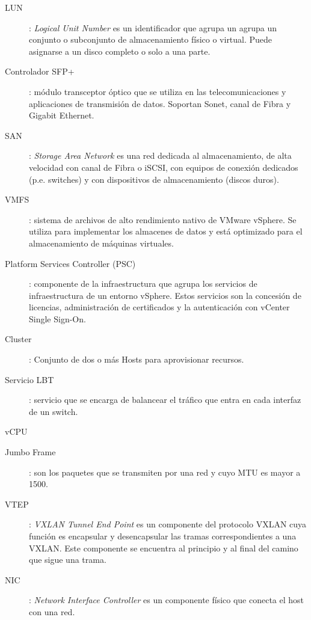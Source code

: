 \begin{description}
 \label{itm:almacendatos}
 \item [LUN]: \textit{Logical Unit Number} es un identificador que agrupa un agrupa un conjunto o subconjunto de almacenamiento físico o virtual. Puede asignarse a un disco completo o solo a una parte.
 \label{itm:lun}
 \item [Controlador SFP+]: módulo transceptor óptico que se utiliza en las telecomunicaciones y aplicaciones de transmisión de datos. Soportan Sonet, canal de Fibra y Gigabit Ethernet.
 \label{itm:sfp}
 \item [SAN]: \textit{Storage Area Network} es una red dedicada al almacenamiento, de alta velocidad con canal de Fibra o iSCSI, con equipos de conexión dedicados (p.e. switches) y con dispositivos de almacenamiento (discos duros). 
 \label{itm:san}
 \item [VMFS]: sistema de archivos de alto rendimiento nativo de VMware vSphere. Se utiliza para implementar los almacenes de datos y está optimizado para el almacenamiento de máquinas virtuales.
 \label{itm:vmfs}
 \item [Platform Services Controller (PSC)]: componente de la infraestructura que agrupa los servicios de infraestructura de un entorno vSphere. Estos servicios son la concesión de licencias, administración de certificados y la autenticación con vCenter Single Sign-On.
 \label{itm:psc}
 \item [Cluster]: Conjunto de dos o más Hosts para aprovisionar recursos.
 \label{itm:cluster}
 \item [Servicio LBT]: servicio que se encarga de balancear el tráfico que entra en cada interfaz de un switch.
 \item [vCPU]
 \label{itm:vcpu}
 \item [Jumbo Frame]: son los paquetes que se transmiten por una red y cuyo MTU es mayor a 1500.
 \label{itm:jumboframe}
 \item [VTEP]: \textit{VXLAN Tunnel End Point} es un componente del protocolo VXLAN cuya función es encapsular y desencapsular las tramas correspondientes a una VXLAN. Este componente se encuentra al principio y al final del camino que sigue una trama.
 \label{itm:vtep}
 \item [NIC]: \textit{Network Interface Controller} es un componente físico que conecta el host con una red.
 \label{itm:nic}
\end{description}
